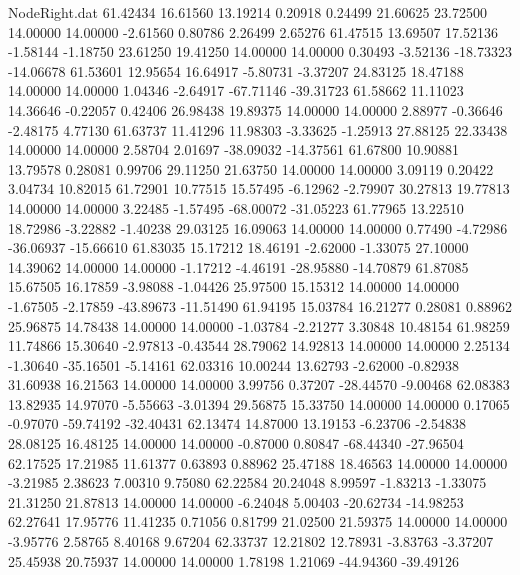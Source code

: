 \begin{filecontents}{NodeRight.dat}
  61.42434   16.61560   13.19214     0.20918    0.24499   21.60625   23.72500   14.00000   14.00000   -2.61560    0.80786    2.26499    2.65276
  61.47515   13.69507   17.52136    -1.58144   -1.18750   23.61250   19.41250   14.00000   14.00000    0.30493   -3.52136  -18.73323  -14.06678
  61.53601   12.95654   16.64917    -5.80731   -3.37207   24.83125   18.47188   14.00000   14.00000    1.04346   -2.64917  -67.71146  -39.31723
  61.58662   11.11023   14.36646    -0.22057    0.42406   26.98438   19.89375   14.00000   14.00000    2.88977   -0.36646   -2.48175    4.77130
  61.63737   11.41296   11.98303    -3.33625   -1.25913   27.88125   22.33438   14.00000   14.00000    2.58704    2.01697  -38.09032  -14.37561
  61.67800   10.90881   13.79578     0.28081    0.99706   29.11250   21.63750   14.00000   14.00000    3.09119    0.20422    3.04734   10.82015
  61.72901   10.77515   15.57495    -6.12962   -2.79907   30.27813   19.77813   14.00000   14.00000    3.22485   -1.57495  -68.00072  -31.05223
  61.77965   13.22510   18.72986    -3.22882   -1.40238   29.03125   16.09063   14.00000   14.00000    0.77490   -4.72986  -36.06937  -15.66610
  61.83035   15.17212   18.46191    -2.62000   -1.33075   27.10000   14.39062   14.00000   14.00000   -1.17212   -4.46191  -28.95880  -14.70879
  61.87085   15.67505   16.17859    -3.98088   -1.04426   25.97500   15.15312   14.00000   14.00000   -1.67505   -2.17859  -43.89673  -11.51490
  61.94195   15.03784   16.21277     0.28081    0.88962   25.96875   14.78438   14.00000   14.00000   -1.03784   -2.21277    3.30848   10.48154
  61.98259   11.74866   15.30640    -2.97813   -0.43544   28.79062   14.92813   14.00000   14.00000    2.25134   -1.30640  -35.16501   -5.14161
  62.03316   10.00244   13.62793    -2.62000   -0.82938   31.60938   16.21563   14.00000   14.00000    3.99756    0.37207  -28.44570   -9.00468
  62.08383   13.82935   14.97070    -5.55663   -3.01394   29.56875   15.33750   14.00000   14.00000    0.17065   -0.97070  -59.74192  -32.40431
  62.13474   14.87000   13.19153    -6.23706   -2.54838   28.08125   16.48125   14.00000   14.00000   -0.87000    0.80847  -68.44340  -27.96504
  62.17525   17.21985   11.61377     0.63893    0.88962   25.47188   18.46563   14.00000   14.00000   -3.21985    2.38623    7.00310    9.75080
  62.22584   20.24048    8.99597    -1.83213   -1.33075   21.31250   21.87813   14.00000   14.00000   -6.24048    5.00403  -20.62734  -14.98253
  62.27641   17.95776   11.41235     0.71056    0.81799   21.02500   21.59375   14.00000   14.00000   -3.95776    2.58765    8.40168    9.67204
  62.33737   12.21802   12.78931    -3.83763   -3.37207   25.45938   20.75937   14.00000   14.00000    1.78198    1.21069  -44.94360  -39.49126

\end{filecontents}

